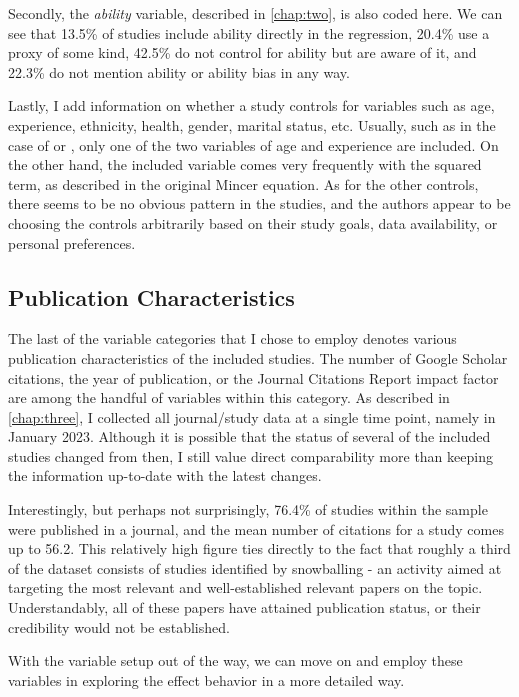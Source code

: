 Secondly, the \textit{ability} variable, described in \autoref{chap:two}, is also coded here. We can see that 13.5\% of studies include ability directly in the regression, 20.4\% use a proxy of some kind, 42.5\% do not control for ability but are aware of it, and 22.3\% do not mention ability or ability bias in any way.

Lastly, I add information on whether a study controls for variables such as age, experience, ethnicity, health, gender, marital status, etc. Usually, such as in the case of \cite{girma2005heterogeneity} or \cite{harmon2002returns}, only one of the two variables of age and experience are included. On the other hand, the included variable comes very frequently with the squared term, as described in the original Mincer equation. As for the other controls, there seems to be no obvious pattern in the studies, and the authors appear to be choosing the controls arbitrarily based on their study goals, data availability, or personal preferences.

\subsection{Publication Characteristics}
\label{subsec:pub_characteristics}

The last of the variable categories that I chose to employ denotes various publication characteristics of the included studies. The number of Google Scholar citations, the year of publication, or the Journal Citations Report impact factor are among the handful of variables within this category. As described in \autoref{chap:three}, I collected all journal/study data at a single time point, namely in January 2023. Although it is possible that the status of several of the included studies changed from then, I still value direct comparability more than keeping the information up-to-date with the latest changes.

Interestingly, but perhaps not surprisingly, 76.4\% of studies within the sample were published in a journal, and the mean number of citations for a study comes up to 56.2. This relatively high figure ties directly to the fact that roughly a third of the dataset consists of studies identified by snowballing - an activity aimed at targeting the most relevant and well-established relevant papers on the topic. Understandably, all of these papers have attained publication status, or their credibility would not be established.

With the variable setup out of the way, we can move on and employ these variables in exploring the effect behavior in a more detailed way.

